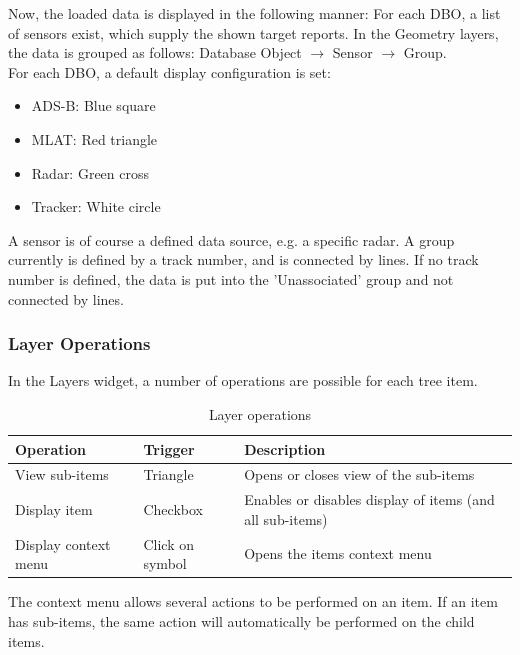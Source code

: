 {Now, the loaded data is displayed in the following manner: For each DBO, a list of sensors exist, which supply the shown target reports. In the Geometry layers, the data is grouped as follows: Database Object $\rightarrow$ Sensor $\rightarrow$ Group. \\

For each DBO, a default display configuration is set:

\begin{itemize}
 \item ADS-B: Blue square
 \item MLAT: Red triangle
 \item Radar: Green cross
 \item Tracker: White circle
\end{itemize}

A sensor is of course a defined data source, e.g. a specific radar. A group currently is defined by a track number, and is connected by lines. If no track number is defined, the data is put into the 'Unassociated' group and not connected by lines.

\subsubsection{Layer Operations}

In the Layers widget, a number of operations are possible for each tree item.

\begin{table}[H]
  \center
  \begin{tabular}{ | l | l | l |}
    \hline
    \textbf{Operation} & \textbf{Trigger} &  \textbf{Description} \\ \hline
    View sub-items & Triangle & Opens or closes view of the sub-items \\ \hline
    Display item & Checkbox & Enables or disables display of items (and all sub-items) \\ \hline
    Display context menu & Click on symbol & Opens the items context menu \\ \hline
  \end{tabular}
  \caption{Layer operations}
\end{table}

The context menu allows several actions to be performed on an item. If an item has sub-items, the same action will automatically be performed on the child items.

}
